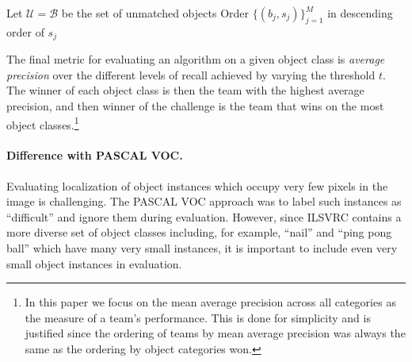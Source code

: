 \begin{algorithm}[t]
 \SetAlgoLined
Let $\mathcal{U} = \mathcal{B}$ be the set of unmatched objects\;
Order $\{(b_j,s_j)\}_{j=1}^M$ in descending order of $s_j$\;
 \caption{The algorithm for greedily matching object detection outputs to ground truth labels. The standard $\mbox{thr}(B_k) = 0.5$~\citep{PASCALIJCV}. ILSVRC computes  $\mbox{thr}(B_k)$  using Eq.~\ref{eq:thr} to better handle low-resolution objects.
}
 \label{algo:deteval} 
\end{algorithm}


The final metric for evaluating an algorithm on a given object class is \emph{average precision}
over the different levels of recall achieved by varying the threshold $t$. The winner of each object class 
is then the team with the highest average precision, and then winner of the challenge is the team that wins on the most
object classes.\footnote{In this paper we focus on the mean average precision across all categories as the measure of a team's performance. This is done for simplicity and is justified since the ordering of teams by mean average precision was always the same as the ordering by object categories won.}

\paragraph{Difference with PASCAL VOC.} 
Evaluating localization of object instances which occupy very few pixels in the image is challenging. The PASCAL VOC approach was to label such instances as ``difficult'' and ignore them during evaluation. However, since ILSVRC contains a more diverse set of object classes including, for example, ``nail'' and ``ping pong ball'' which have many very small instances, it is important to include even very small object instances in evaluation. 


